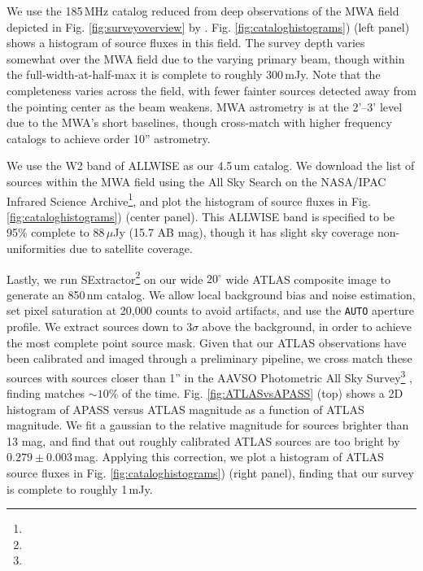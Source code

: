 \documentclass{emulateapj}
\begin{document}
We use the 185\,MHz catalog reduced from deep observations of the MWA field depicted in Fig. \ref{fig:surveyoverview} by \citep{PattiCatalog1}. Fig. \ref{fig:cataloghistograms}) (left panel) shows a histogram of source fluxes in this field. The survey depth varies somewhat over the MWA field due to the varying primary beam, though within the full-width-at-half-max it is complete to roughly 300\,mJy. Note that the completeness varies across the field, with fewer fainter sources detected away from the pointing center as the beam weakens. MWA astrometry is at the 2'--3' level due to the MWA's short baselines, though \citep{PattiCatalog1} cross-match with higher frequency catalogs to achieve order 10'' astrometry. 

We use the W2 band of ALLWISE \citep{Wright2010,allwise} as our 4.5\,um catalog. We download the list of sources within the MWA field using the All Sky Search on the NASA/IPAC Infrared Science Archive\footnote{}, and plot the histogram of source fluxes in Fig. \ref{fig:cataloghistograms}) (center panel). This ALLWISE band is specified to be 95\% complete to 88\,$\mu$Jy (15.7 AB mag), though it has slight sky coverage non-uniformities due to satellite coverage.

Lastly, we run SExtractor\footnote{} \citep{sextractor} on our wide $20^\circ$ wide ATLAS composite image to generate an 850\,nm catalog. We allow local background bias and noise estimation, set pixel saturation at 20,000 counts to avoid artifacts, and use the {\tt AUTO} aperture profile. We extract sources down to $3\sigma$ above the background, in order to achieve the most complete point source mask. Given that our ATLAS observations have been calibrated and imaged through a preliminary pipeline, we cross match these sources with sources closer than 1'' in the AAVSO Photometric All Sky Survey\footnote{} \citep{apass}, finding matches $\sim10\%$ of the time. Fig. \ref{fig:ATLASvsAPASS} (top) shows a 2D histogram of APASS versus ATLAS magnitude as a function of ATLAS magnitude. We fit a gaussian to the relative magnitude for sources brighter than 13 mag, and find that out roughly calibrated ATLAS sources are too bright by $0.279\pm0.003$\,mag. Applying this correction, we plot a histogram of ATLAS source fluxes in Fig. \ref{fig:cataloghistograms}) (right panel), finding that our survey is complete to roughly 1\,mJy.
\end{document}
